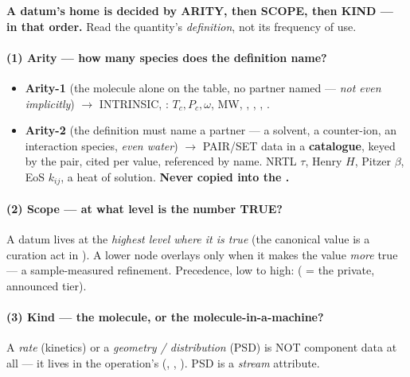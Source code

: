 \documentclass[11pt,a4paper]{article}
\begin{document}
\begin{keyidea}
\textbf{A datum's home is decided by ARITY, then SCOPE, then KIND --- in that
order.}  Read the quantity's \emph{definition}, not its frequency of use.
\end{keyidea}

\paragraph{(1) Arity --- how many species does the definition name?}
\begin{itemize}[leftmargin=*,nosep]
  \item \textbf{Arity-1} (the molecule alone on the table, no partner named ---
        \emph{not even implicitly}) $\to$ INTRINSIC,
        : \(T_c, P_c, \omega\), MW,
        , , ,
        .
  \item \textbf{Arity-2} (the definition must name a partner --- a solvent, a
        counter-ion, an interaction species, \emph{even water}) $\to$ PAIR/SET
        data in a \textbf{catalogue}, keyed by the pair, cited per value,
        referenced by name.  NRTL \(\tau\), Henry \(H\), Pitzer \(\beta\), EoS
        \(k_{ij}\), a heat of solution.  \textbf{Never copied into the
        .}
\end{itemize}

\paragraph{(2) Scope --- at what level is the number TRUE?}  A datum lives at
the \emph{highest level where it is true} (the canonical value is a curation act
in ).  A lower node overlays only when it makes the value
\emph{more} true --- a sample-measured refinement.  Precedence, low to high:
 ( = the private,
announced  tier).

\paragraph{(3) Kind --- the molecule, or the molecule-in-a-machine?}  A
\emph{rate} (kinetics) or a \emph{geometry / distribution} (PSD) is NOT
component data at all --- it lives in the operation's 
(, ,
).  PSD is a \emph{stream} attribute.
\end{document}
